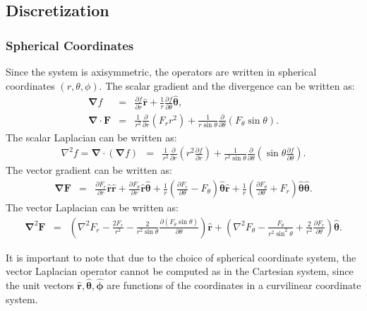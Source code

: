 \documentclass[final]{elsarticle}
\newcommand{\deriv}[2]{\frac{\partial #1}{\partial #2}}
\newcommand{\pars}[1]{\left(#1\right)}
\newcommand\Laplacian{\nabla^2}
\newcommand\bnabla{\boldsymbol{\nabla}}
\newcommand\bLaplacian{\boldsymbol{\nabla}^2}
\newcommand\bF{\boldsymbol{F}}
\newcommand\br{\boldsymbol{r}}
\newcommand\brhat{\hat{\br}}
\newcommand\btheta{\boldsymbol{\theta}}
\newcommand\bthetahat{\hat{\btheta}}
\newcommand\bphi{\boldsymbol{\phi}}
\newcommand\bphihat{\hat{\bphi}}
\begin{document}
\subsection{Discretization}
\subsubsection{Spherical Coordinates}
Since the system is axisymmetric, the operators are written in 
spherical coordinates $(r,\theta,\phi)$.
The scalar gradient and the divergence can be written as:
\begin{eqnarray*}
\bnabla f &=& \deriv{f}{r}\brhat + \frac{1}{r}\deriv{f}{\theta}\bthetahat, \\
\bnabla \cdot \bF &=& \frac{1}{r^2}\deriv{}{r}\pars{F_r r^2 } + 
               \frac{1}{r \sin\theta}\deriv{}{\theta}\pars{F_\theta \sin\theta}.
\end{eqnarray*}
The scalar Laplacian can be written as:
\begin{eqnarray*}
\Laplacian f = \bnabla \cdot (\bnabla f)&=& 
 \frac{1}{r^2}\deriv{}{r}\pars{r^2 \deriv{f}{r}} + 
 \frac{1}{r^2 \sin\theta}\deriv{}{\theta}\pars{\sin\theta \deriv{f}{\theta}}.
\end{eqnarray*}
The vector gradient can be written as:
\begin{eqnarray*}
\bnabla \bF &=& \deriv{F_r}{r} \brhat \brhat + \deriv{F_\theta}{r} \brhat \bthetahat + 
\frac{1}{r}\pars{\deriv{F_r}{\theta} - F_\theta} \bthetahat \brhat + 
\frac{1}{r}\pars{\deriv{F_\theta}{\theta} + F_r} \bthetahat \bthetahat.
\end{eqnarray*}
The vector Laplacian can be written as:
\begin{eqnarray*}
\bLaplacian \bF &=& 
\left(\Laplacian F_r - \frac{2F_r}{r^2} - 
\frac{2}{r^2 \sin\theta} \deriv{\left(F_\theta \sin\theta \right)}{\theta}\right)\brhat
+ \left(\Laplacian F_\theta - \frac{F_\theta}{r^2 \sin^2\theta} + 
\frac{2}{r^2}\deriv{F_r}{\theta}\right) \bthetahat.
\end{eqnarray*}

It is important to note that due to the choice of spherical coordinate system,
the vector Laplacian operator cannot be computed as in the Cartesian system,
since the unit vectors $\brhat, \bthetahat, \bphihat$ are functions of the coordinates
in a curvilinear coordinate system.
\end{document}

